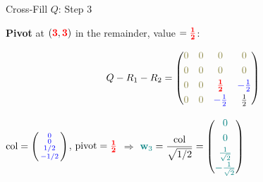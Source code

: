 \documentclass[10pt]{beamer}
\theoremstyle{definition}
\newcommand{\x}[1]{\alert{\textbf{#1}}}
\newcommand{\pvt}[1]{{\color{red}\mathbf{#1}}}       %
\newcommand{\crs}[1]{{\color{blue}#1}}                %
\newcommand{\ghost}[1]{{\color{yellow!50!black}#1}}   %
\newcommand{\tl}[1]{{\color{teal}#1}}                 %
\begin{document}
\begin{frame}{Cross-Fill $Q$: Step 3}

\x{Pivot} at $(\pvt{3},\pvt{3})$ in the remainder, value $= \pvt{\frac{1}{2}}$:

$$Q - R_1 - R_2 = \begin{pmatrix} \ghost{0} & \ghost{0} & \ghost{0} & \ghost{0} \\[3pt] \ghost{0} & \ghost{0} & \ghost{0} & \ghost{0} \\[3pt] \ghost{0} & \ghost{0} & \pvt{\frac{1}{2}} & \crs{-\frac{1}{2}} \\[3pt] \ghost{0} & \ghost{0} & \crs{-\frac{1}{2}} & \frac{1}{2} \end{pmatrix}$$

$\text{col} = \left(\begin{smallmatrix} \crs{0} \\ \crs{0} \\ \crs{1/2} \\ \crs{-1/2} \end{smallmatrix}\right)$, \quad $\text{pivot} = \pvt{\frac{1}{2}}$ \qquad $\Longrightarrow$ \qquad $\tl{\mathbf{w}_3} = \dfrac{\text{col}}{\sqrt{1/2}} = \begin{pmatrix} \tl{0} \\[3pt] \tl{0} \\[3pt] \tl{\frac{1}{\sqrt{2}}} \\[3pt] \tl{-\frac{1}{\sqrt{2}}} \end{pmatrix}$

\end{frame}
\end{document}

